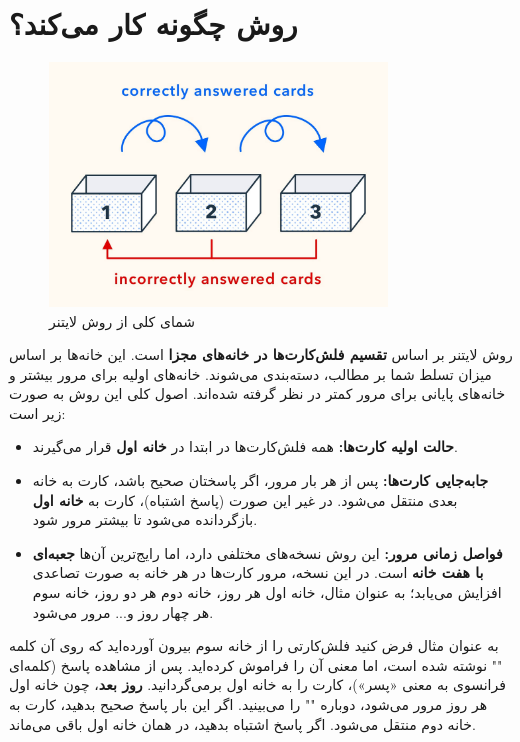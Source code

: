 \documentclass[12pt]{report}
\begin{document}
\section{روش  چگونه کار می‌کند؟}

\begin{figure}[h!]
  \centering
  \includegraphics[width=0.8\textwidth]{images/leitner-overview.png}
  \caption{شمای کلی از روش لایتنر}
  \label{fig:leitner-overview}
\end{figure}

روش لایتنر بر اساس \textbf{تقسیم فلش‌کارت‌ها در خانه‌های مجزا} است. این خانه‌ها بر اساس میزان تسلط شما بر مطالب، دسته‌بندی می‌شوند. خانه‌های اولیه برای مرور بیشتر و خانه‌های پایانی برای مرور کمتر در نظر گرفته شده‌اند. اصول کلی این روش به صورت زیر است:


\begin{itemize}
    \item \textbf{حالت اولیه کارت‌ها:} همه فلش‌کارت‌ها در ابتدا در \textbf{خانه اول} قرار می‌گیرند.
    \item \textbf{جابه‌جایی کارت‌ها:} پس از هر بار مرور، اگر پاسختان صحیح باشد، کارت به خانه بعدی منتقل می‌شود. در غیر این صورت (پاسخ اشتباه)، کارت به \textbf{خانه اول} بازگردانده می‌شود تا بیشتر مرور شود.
    \item \textbf{فواصل زمانی مرور:} این روش نسخه‌های مختلفی دارد، اما رایج‌ترین آن‌ها \textbf{جعبه‌ای با هفت خانه} است. در این نسخه، مرور کارت‌ها در هر خانه به صورت تصاعدی افزایش می‌یابد؛ به عنوان مثال، خانه اول هر روز، خانه دوم هر دو روز، خانه سوم هر چهار روز و... مرور می‌شود.\cite{trainable}
\end{itemize}

به عنوان مثال فرض کنید فلش‌کارتی را از خانه سوم بیرون آورده‌اید که روی آن کلمه "" نوشته شده است، اما معنی آن را فراموش کرده‌اید. پس از مشاهده پاسخ (کلمه‌ای فرانسوی به معنی «پسر»)، کارت را به خانه اول برمی‌گردانید. \textbf{روز بعد}، چون خانه اول هر روز مرور می‌شود، دوباره "" را می‌بینید. اگر این بار پاسخ صحیح بدهید، کارت به خانه دوم منتقل می‌شود. اگر پاسخ اشتباه بدهید، در همان خانه اول باقی می‌ماند.
\end{document}
